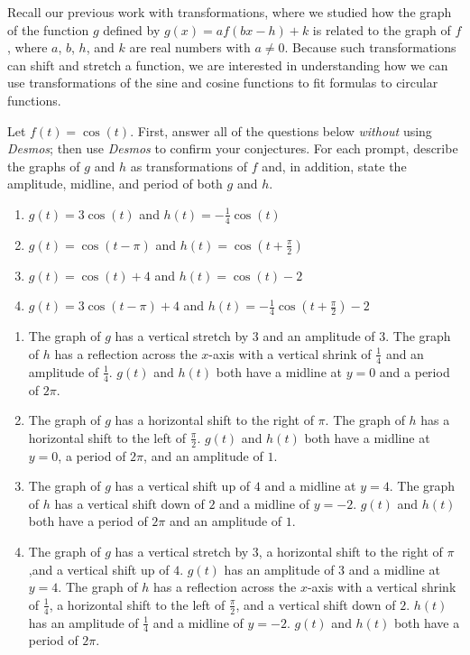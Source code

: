 \documentclass{ximera}
\begin{document}
Recall our previous work with transformations, where we studied how the graph of the function \(g\) defined by \(g(x) = af(bx - h) + k\) is related to the graph of \(f\), where \(a\), \(b\), $h$, and \(k\) are real numbers with \(a \ne 0\).  Because such transformations can shift and stretch a function, we are interested in understanding how we can use transformations of the sine and cosine functions to fit formulas to circular functions.%
\begin{example}
Let \(f(t) = \cos(t)\).  First, answer all of the questions below \emph{without} using \emph{Desmos}; then use \emph{Desmos} to confirm your conjectures.  For each prompt, describe the graphs of \(g\) and \(h\) as transformations of \(f\) and, in addition, state the amplitude, midline, and period of both \(g\) and \(h\).%
\begin{enumerate}[label=\alph*.]
\item \(g(t) = 3\cos(t)\) and \(h(t) = -\frac{1}{4}\cos(t)\)%
\item \(g(t) = \cos(t-\pi)\) and \(h(t) = \cos\left(t+ \frac{\pi}{2}\right)\)%
\item \(g(t) = \cos(t)+4\) and \(h(t) = \cos\left(t\right)-2\)%
\item \(g(t) = 3\cos(t-\pi)+4\) and \(h(t) = -\frac{1}{4}\cos\left(t+ \frac{\pi}{2}\right)-2\)%
\end{enumerate}
\begin{explanation}
\begin{enumerate}[label=\alph*.]
\item The graph of $g$ has a vertical stretch by 3 and an amplitude of 3. The graph of $h$ has a reflection across the $x$-axis with a vertical shrink of $\frac{1}{4}$ and an amplitude of $\frac{1}{4}$. $g(t)$ and $h(t)$ both have a midline at $y=0$ and a period of $2\pi$.
\item The graph of $g$ has a horizontal shift to the right of $\pi$. The graph of $h$ has a horizontal shift to the left of $\frac{\pi}{2}$. $g(t)$ and $h(t)$ both have a midline at $y=0$, a period of $2\pi$, and an amplitude of $1$.
\item The graph of $g$ has a vertical shift up of $4$ and a midline at $y=4$. The graph of $h$ has a vertical shift down of $2$ and a midline of $y=-2$. $g(t)$ and $h(t)$ both have a period of $2\pi$ and an amplitude of $1$.
\item The graph of $g$ has a vertical stretch by 3,  a horizontal shift to the right of $\pi$,and a vertical shift up of $4$. $g(t)$ has an amplitude of 3 and a midline at $y=4$. The graph of $h$ has a reflection across the $x$-axis with a vertical shrink of $\frac{1}{4}$, a horizontal shift to the left of $\frac{\pi}{2}$, and a vertical shift down of $2$. $h(t)$has an amplitude of $\frac{1}{4}$ and a midline of $y=-2$. $g(t)$ and $h(t)$ both have a period of $2\pi$.
\end{enumerate}
\end{explanation}
%
\end{example}
\end{document}
